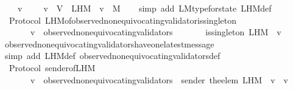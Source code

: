 \begin{isabellebody}
\ \ {\isachardoublequoteopen}{\isasymforall}\ {\isasymsigma}\ v{\isachardot}\ {\isasymsigma}\ {\isasymin}\ {\isasymSigma}\ {\isasymand}\ v\ {\isasymin}\ V\ {\isasymlongrightarrow}\ L{\isacharunderscore}H{\isacharunderscore}M\ {\isasymsigma}\ v\ {\isasymsubseteq}\ M{\isachardoublequoteclose}\isanewline
%
\isadelimproof
\ \ %
\endisadelimproof
%
\isatagproof
{}\isamarkupfalse%
\ {\isacharparenleft}simp\ add{\isacharcolon}\ L{\isacharunderscore}M{\isacharunderscore}type{\isacharunderscore}for{\isacharunderscore}state\ L{\isacharunderscore}H{\isacharunderscore}M{\isacharunderscore}def{\isacharparenright}%
\endisatagproof
{\isafoldproof}%
%
\isadelimproof
\isanewline
%
\endisadelimproof
\isanewline
\isanewline
{}\isamarkupfalse%
\ {\isacharparenleft}\ Protocol{\isacharparenright}\ L{\isacharunderscore}H{\isacharunderscore}M{\isacharunderscore}of{\isacharunderscore}observed{\isacharunderscore}non{\isacharunderscore}equivocating{\isacharunderscore}validator{\isacharunderscore}is{\isacharunderscore}singleton\ {\isacharcolon}\isanewline
\ \ {\isachardoublequoteopen}{\isasymforall}\ {\isasymsigma}\ {\isasymin}\ {\isasymSigma}{\isachardot}\ {\isasymforall}\ v\ {\isasymin}\ observed{\isacharunderscore}non{\isacharunderscore}equivocating{\isacharunderscore}validators\ {\isasymsigma}{\isachardot}\isanewline
\ \ \ \ \ \ is{\isacharunderscore}singleton\ {\isacharparenleft}L{\isacharunderscore}H{\isacharunderscore}M\ {\isasymsigma}\ v{\isacharparenright}{\isachardoublequoteclose}\isanewline
%
\isadelimproof
\ \ %
\endisadelimproof
%
\isatagproof
{}\isamarkupfalse%
\ observed{\isacharunderscore}non{\isacharunderscore}equivocating{\isacharunderscore}validators{\isacharunderscore}have{\isacharunderscore}one{\isacharunderscore}latest{\isacharunderscore}message\ \isanewline
\ \ \isamarkupfalse%
\ {\isacharparenleft}simp\ add{\isacharcolon}\ L{\isacharunderscore}H{\isacharunderscore}M{\isacharunderscore}def\ observed{\isacharunderscore}non{\isacharunderscore}equivocating{\isacharunderscore}validators{\isacharunderscore}def{\isacharparenright}%
\endisatagproof
{\isafoldproof}%
%
\isadelimproof
\isanewline
%
\endisadelimproof
\isanewline
\isanewline
{}\isamarkupfalse%
\ {\isacharparenleft}\ Protocol{\isacharparenright}\ sender{\isacharunderscore}of{\isacharunderscore}L{\isacharunderscore}H{\isacharunderscore}M{\isacharcolon}\ \isanewline
\ \ {\isachardoublequoteopen}{\isasymforall}\ {\isasymsigma}\ {\isasymin}\ {\isasymSigma}{\isachardot}\ {\isasymforall}\ v\ {\isasymin}\ observed{\isacharunderscore}non{\isacharunderscore}equivocating{\isacharunderscore}validators\ {\isasymsigma}{\isachardot}\ sender\ {\isacharparenleft}the{\isacharunderscore}elem\ {\isacharparenleft}L{\isacharunderscore}H{\isacharunderscore}M\ {\isasymsigma}\ v{\isacharparenright}{\isacharparenright}\ {\isacharequal}\ v{\isachardoublequoteclose}\ \isanewline

\end{isabellebody}
